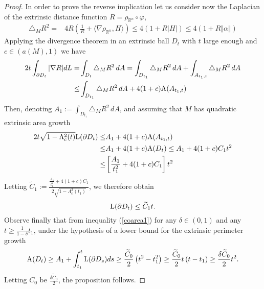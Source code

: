 \documentclass[a4paper]{amsart}
\theoremstyle{definition}
\numberwithin{equation}{section}
\begin{document}
\begin{proof}
In order to prove the reverse implication let us consider now  the Laplacian of the extrinsic distance function $R=\rho_{{\mathbb{R}}^n}\circ \varphi$,
\begin{equation}
\begin{aligned}
\triangle_MR^2=&4R\left(\frac{1}{R}+\langle \nabla \rho_{{\mathbb{R}}^n},H\rangle\right)\leq 4\left(1+R\vert H\vert\right)\leq 4\left(1+R\Vert \alpha \Vert\right) 
\end{aligned}
\end{equation}
Applying the divergence theorem in an extrinsic ball $D_t$ with $t$ large enough and $c\in (a(M),1)$ we have 
\begin{equation}
\begin{aligned}
2t\int_{\partial D_t}\vert \nabla R\vert dL=&\int_{D_t}\triangle_MR^2\, dA=\int_{D_{t_1}}\triangle_MR^2\, dA +\int_{A_{t_1,t}}\triangle_MR^2\, dA\\
\leq&  \int_{D_{t_1}}\triangle_MR^2\, dA +4(1+c){\rm A}(A_{t_1,t})
\end{aligned}
\end{equation}
Then, denoting $A_1:=\int_{D_{t_1}}\triangle_MR^2\, dA$, and assuming that $M$ has quadratic extrinsic area growth
\begin{equation}
\begin{aligned}
2t\sqrt{1-\Lambda_c^2(t)}{\rm L}(\partial D_t)\leq& A_1+4(1+c){\rm A}(A_{t_1,t})\\
\leq & A_1+4(1+c){\rm A}(D_{t})\leq A_1+4(1+c)C_1t^2\\
\leq & \left[\frac{A_1}{t_1^2}+4(1+c)C_1\right]t^2
\end{aligned}
\end{equation}
Letting $\widetilde C_1:=\frac{\frac{A_1}{t_1^2}+4(1+c)C_1}{2\sqrt{1-\Lambda_c^2(t_1)}}$, we therefore obtain
\begin{equation}
{\rm L}(\partial D_t)\leq \widetilde C_1 t.
\end{equation}
Observe finally that from inequality (\ref{coarea1}) for any $\delta\in (0,1)$ and any $t\geq\frac{1}{1-\delta}t_1$, under the hypothesis of a lower bound for the extrinsic perimeter growth 
\begin{equation}
{\rm A}(D_t)\geq A_1+\int_{t_1}^t{\rm L}(\partial D_s)ds\geq \frac{\widetilde C_0}{2}\left(t^2-t_1^2\right)\geq \frac{\widetilde C_0}{2}t\left(t-t_1\right)\geq\frac{\delta\widetilde C_0}{2}t^2.
\end{equation}
Letting $C_0$ be $\frac{\delta\widetilde C_0}{2}$, the proposition follows.
\end{proof}
\end{document}
